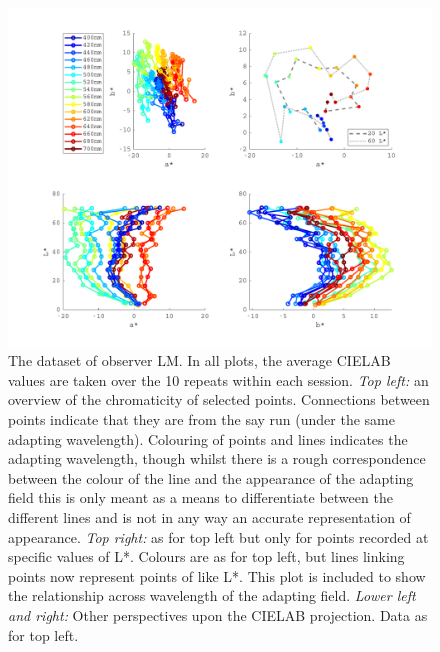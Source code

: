\begin{figure}[htbp]
\includegraphics[max width=1.2\textwidth, center]{figs/LargeSphere/LMdataOverview.pdf}
\caption{The dataset of observer LM. In all plots, the average CIELAB values are taken over the 10 repeats within each session. \emph{Top left:} an overview of the chromaticity of selected points. Connections between points indicate that they are from the say run (under the same adapting wavelength). Colouring of points and lines indicates the adapting wavelength, though whilst there is a rough correspondence between the colour of the line and the appearance of the adapting field this is only meant as a means to differentiate between the different lines and is not in any way an accurate representation of appearance. \emph{Top right:} as for top left but only for points recorded at specific values of L*. Colours are as for top left, but lines linking points now represent points of like L*. This plot is included to show the relationship across wavelength of the adapting field. \emph{Lower left and right:} Other perspectives upon the CIELAB projection. Data as for top left.}
\label{fig:overviewLM}
\end{figure}

